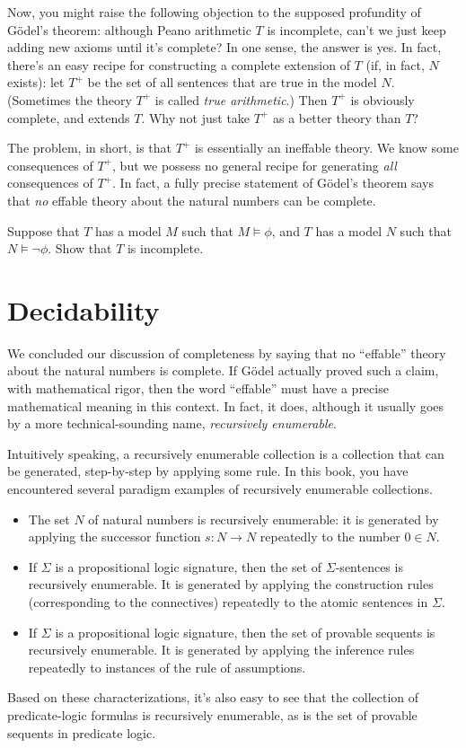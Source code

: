 Now, you might raise the following objection to the supposed
profundity of G{\"o}del's theorem: although Peano arithmetic $T$ is
incomplete, can't we just keep adding new axioms until it's complete?
In one sense, the answer is yes.  In fact, there's an easy recipe for
constructing a complete extension of $T$ (if, in fact, $N$ exists):
let $T^+$ be the set of all sentences that are true in the model $N$.
(Sometimes the theory $T^+$ is called \emph{true arithmetic}.)  Then
$T^+$ is obviously complete, and extends $T$.  Why not just take $T^+$
as a better theory than $T$?

The problem, in short, is that $T^+$ is essentially an ineffable
theory.  We know some consequences of $T^+$, but we possess no general
recipe for generating {\it all} consequences of $T^+$.  In fact, a
fully precise statement of G{\"o}del's theorem says that {\it no}
effable theory about the natural numbers can be complete.


\begin{exercise} Suppose that $T$ has a model $M$ such that
  $M\vDash\phi$, and $T$ has a model $N$ such that $N\vDash\neg\phi$.
  Show that $T$ is incomplete. \end{exercise}

\section{Decidability}

We concluded our discussion of completeness by saying that no
``effable'' theory about the natural numbers is complete.  If
G{\"o}del actually proved such a claim, with mathematical rigor, then
the word ``effable'' must have a precise mathematical meaning in this
context.  In fact, it does, although it usually goes by a more
technical-sounding name, \emph{recursively enumerable}.

Intuitively speaking, a recursively enumerable collection is a
collection that can be generated, step-by-step by applying some rule.
In this book, you have encountered several paradigm examples of
recursively enumerable collections.
\begin{itemize}
\item The set $N$ of natural numbers is recursively enumerable: it is
  generated by applying the successor function $s:N\to N$ repeatedly
  to the number $0\in N$.
\item If $\Sigma$ is a propositional logic signature, then the set of
  $\Sigma$-sentences is recursively enumerable.  It is generated by
  applying the construction rules (corresponding to the connectives)
  repeatedly to the atomic sentences in $\Sigma$.
\item If $\Sigma$ is a propositional logic signature, then the set of
  provable sequents is recursively enumerable.  It is generated by
  applying the inference rules repeatedly to instances of the rule of
  assumptions.  
\end{itemize}
Based on these characterizations, it's also easy to see that the
collection of predicate-logic formulas is recursively enumerable, as
is the set of provable sequents in predicate logic.

